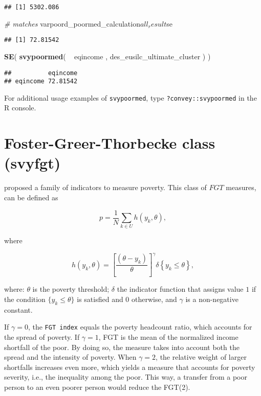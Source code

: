 \documentclass[]{book}
\newenvironment{Shaded}{\begin{snugshade}}{\end{snugshade}}
\newcommand{\KeywordTok}[1]{\textcolor[rgb]{0.13,0.29,0.53}{\textbf{{#1}}}}
\newcommand{\StringTok}[1]{\textcolor[rgb]{0.31,0.60,0.02}{{#1}}}
\newcommand{\CommentTok}[1]{\textcolor[rgb]{0.56,0.35,0.01}{\textit{{#1}}}}
\newcommand{\NormalTok}[1]{{#1}}
\begin{document}
\begin{verbatim}
## [1] 5302.086
\end{verbatim}

\begin{Shaded}
\begin{Highlighting}[]
\CommentTok{# matches}
\NormalTok{varpoord_poormed_calculation$all_result$se}
\end{Highlighting}
\end{Shaded}

\begin{verbatim}
## [1] 72.81542
\end{verbatim}

\begin{Shaded}
\begin{Highlighting}[]
\KeywordTok{SE}\NormalTok{( }\KeywordTok{svypoormed}\NormalTok{( ~}\StringTok{ }\NormalTok{eqincome , des_eusilc_ultimate_cluster ) )}
\end{Highlighting}
\end{Shaded}

\begin{verbatim}
##          eqincome
## eqincome 72.81542
\end{verbatim}

For additional usage examples of \texttt{svypoormed}, type
\texttt{?convey::svypoormed} in the R console.

\section{Foster-Greer-Thorbecke class
(svyfgt)}\label{foster-greer-thorbecke-class-svyfgt}

\citet{foster1984} proposed a family of indicators to measure poverty.
This class of \(FGT\) measures, can be defined as

\[
p=\frac{1}{N}\sum_{k\in U}h(y_{k},\theta ), 
\]

where

\[
h(y_{k},\theta )=\left[ \frac{(\theta -y_{k})}{\theta }\right] ^{\gamma
}\delta \left\{ y_{k}\leq \theta \right\} , 
\]

where: \(\theta\) is the poverty threshold; \(\delta\) the indicator
function that assigns value \(1\) if the condition
\(\{y_{k}\leq \theta \}\) is satisfied and \(0\) otherwise, and
\(\gamma\) is a non-negative constant.

If \(\gamma =0\), the \texttt{FGT\ index} equals the poverty headcount
ratio, which accounts for the spread of poverty. If \(\gamma =1\), FGT
is the mean of the normalized income shortfall of the poor. By doing so,
the measure takes into account both the spread and the intensity of
poverty. When \(\gamma =2\), the relative weight of larger shortfalls
increases even more, which yields a measure that accounts for poverty
severity, i.e., the inequality among the poor. This way, a transfer from
a poor person to an even poorer person would reduce the FGT(2).
\end{document}
